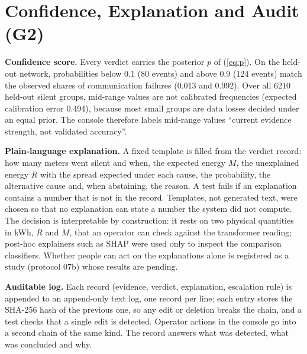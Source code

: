 \section{Confidence, Explanation and Audit (G2)}\label{sec:explain}
\textbf{Confidence score.} Every verdict carries the posterior $p$ of (\ref{eq:p}). On the held-out
network, probabilities below 0.1 (80 events) and above 0.9 (124 events) match the observed shares of
communication failures (0.013 and 0.992). Over all 6210 held-out silent groups, mid-range values are
not calibrated frequencies (expected calibration error 0.494), because most small groups are data
losses decided under an equal prior. The console therefore labels mid-range values ``current evidence
strength, not validated accuracy''.

\textbf{Plain-language explanation.} A fixed template is filled from the verdict record: how many
meters went silent and when, the expected energy $M$, the unexplained energy $R$ with the spread
expected under each cause, the probability, the alternative cause and, when abstaining, the reason. A
test fails if an explanation contains a number that is not in the record. Templates, not generated
text, were chosen so that no explanation can state a number the system did not compute. The decision
is interpretable by construction: it rests on two physical quantities in kWh, $R$ and $M$, that an
operator can check against the transformer reading; post-hoc explainers such as SHAP
\cite{lundberg2017shap} were used only to inspect the comparison classifiers. Whether
people can act on the explanations alone is registered as a study (protocol 07b) whose results are
pending.

\textbf{Auditable log.} Each record (evidence, verdict, explanation, escalation rule) is appended to an
append-only text log, one record per line; each entry stores the SHA-256 hash of the previous one, so any edit or deletion breaks
the chain, and a test checks that a single edit is detected. Operator actions in the console go into
a second chain of the same kind. The record answers what was detected, what was concluded and why.
